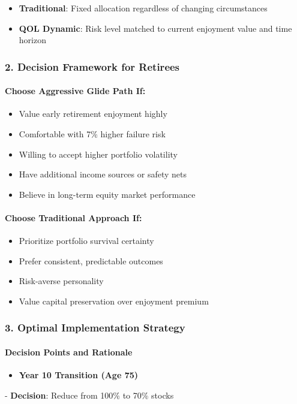 \documentclass[11pt,letterpaper]{article}
\begin{document}
\begin{itemize}
\item \textbf{Traditional}: Fixed allocation regardless of changing circumstances
\item \textbf{QOL Dynamic}: Risk level matched to current enjoyment value and time horizon
\end{itemize}

\subsubsection{2. Decision Framework for Retirees}

\paragraph{Choose Aggressive Glide Path If:}
\begin{itemize}
\item Value early retirement enjoyment highly
\item Comfortable with 7\% higher failure risk
\item Willing to accept higher portfolio volatility
\item Have additional income sources or safety nets
\item Believe in long-term equity market performance
\end{itemize}

\paragraph{Choose Traditional Approach If:}
\begin{itemize}
\item Prioritize portfolio survival certainty
\item Prefer consistent, predictable outcomes
\item Risk-averse personality
\item Value capital preservation over enjoyment premium
\end{itemize}

\subsubsection{3. Optimal Implementation Strategy}

\paragraph{Decision Points and Rationale}
\begin{itemize}
\item \textbf{Year 10 Transition (Age 75)}
\end{itemize}
   - \textbf{Decision}: Reduce from 100\% to 70\% stocks
\end{document}
